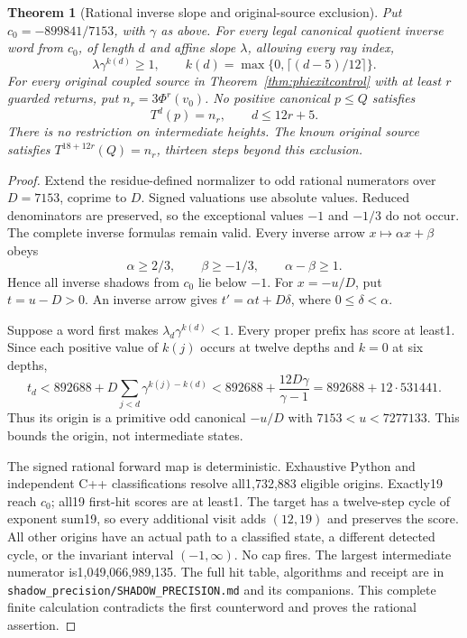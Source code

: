 \documentclass[11pt]{article}
\newtheorem{theorem}{Theorem}
\begin{document}
\begin{theorem}[Rational inverse slope and original-source exclusion]
\label{thm:shadowprecision}
Put $c_0=-899841/7153$, with $\gamma$ as above. For every legal canonical
quotient inverse word from $c_0$, of length $d$ and affine slope $\lambda$,
allowing every ray index,
\[
 \lambda\gamma^{k(d)}\ge1,
 \qquad k(d)=\max\{0,\lceil(d-5)/12\rceil\}.
\]
For every original coupled source in Theorem~\ref{thm:phiexitcontrol}
with at least $r$ guarded returns, put $n_r=3\Phi^r(v_0)$.
No positive canonical $p\le Q$ satisfies
\[
 T^d(p)=n_r,\qquad d\le12r+5.
\]
There is no restriction on intermediate heights. The known original
source satisfies $T^{18+12r}(Q)=n_r$, thirteen steps beyond this exclusion.
\end{theorem}
\begin{proof}
Extend the residue-defined normalizer to odd rational numerators over
$D=7153$, coprime to $D$. Signed valuations use absolute values.
Reduced denominators are preserved, so the exceptional values $-1$ and
$-1/3$ do not occur. The complete inverse formulas remain valid.
Every inverse arrow $x\mapsto\alpha x+\beta$ obeys
\[
 \alpha\ge2/3,\qquad \beta\ge-1/3,\qquad \alpha-\beta\ge1.
\]
Hence all inverse shadows from $c_0$ lie below $-1$.
For $x=-u/D$, put $t=u-D>0$. An inverse arrow gives
$t'=\alpha t+D\delta$, where $0\le\delta<\alpha$.

Suppose a word first makes $\lambda_d\gamma^{k(d)}<1$.
Every proper prefix has score at least1. Since each positive value of
$k(j)$ occurs at twelve depths and $k=0$ at six depths,
\[
 t_d<892688+D\sum_{j<d}\gamma^{k(j)-k(d)}
     <892688+\frac{12D\gamma}{\gamma-1}
     =892688+12\cdot531441.
\]
Thus its origin is a primitive odd canonical $-u/D$ with
$7153<u<7277133$. This bounds the origin, not intermediate states.

The signed rational forward map is deterministic. Exhaustive Python and
independent C++ classifications resolve all1,732,883 eligible origins.
Exactly19 reach $c_0$; all19 first-hit scores are at least1.
The target has a twelve-step cycle of exponent sum19, so every additional
visit adds $(12,19)$ and preserves the score. All other origins have an
actual path to a classified state, a different detected cycle, or the
invariant interval $(-1,\infty)$. No cap fires. The largest intermediate
numerator is1,049,066,989,135. The full hit table, algorithms and receipt
are in \texttt{shadow\_precision/SHADOW\_PRECISION.md} and its companions.
This complete finite calculation contradicts the first counterword and
proves the rational assertion.


\end{proof}
\end{document}
